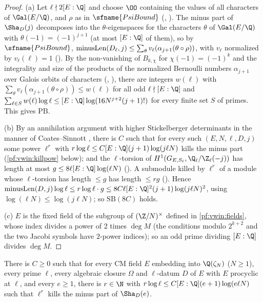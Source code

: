 \begin{proof}
(a) Let $\ell\nmid2[E:\Q]$ and choose $\OO$ containing the values of all characters of $\Gal(E/\Q)$, and $\rho$ as in $\sfname{PsiBound}$
(, ). The minus part of $\Sha_D(j)$ decomposes into the
$\theta$-eigenspaces for the characters $\theta$ of $\Gal(E/\Q)$ with $\theta(-1)=(-1)^{j+1}$ (at most $[E:\Q]$ of them), so by
$\sfname{PsiBound}$, $\mathrm{minusLen}(D_\ell,j)\le\sum_\theta v_\ell(\alpha_{j+1}(\theta\circ\rho))$, with $v_\ell$ normalized by $v_\ell(\ell)=1$
(). By the non-vanishing of $B_{k,\chi}$ for $\chi(-1)=(-1)^k$ and the integrality and size of the products of
the normalized Bernoulli numbers $\alpha_{j+1}$ over Galois orbits of characters (,
), there are integers $w(\ell)$ with $\sum_\theta v_\ell(\alpha_{j+1}(\theta\circ\rho))\le w(\ell)$ for all
odd $\ell\nmid[E:\Q]$ and $\sum_{\ell\in S}w(\ell)\log\ell\le[E:\Q]\log(16N^{j+2}(j+1)!)$ for every finite set $S$ of primes. This gives
$\mathrm{PB}$.

(b) By an annihilation argument with higher Stickelberger determinants in the manner of Coates--Sinnott \cite{CoatesSinnott1974}, there is $C$
such that for every such $(E,N,\ell,D,j)$ some power $\ell^r$ with $r\log\ell\le C[E:\Q](j+1)\log(j\ell N)$ kills the minus part
(\cref{pf:vwin:killpow} below); and the $\ell$-torsion of $H^1(G_{E,S_\ell},\vwinQZ(-j))$ has length at most
$g\le8\ell[E:\Q]\log(\ell N)$ (). A submodule killed by $\ell^r$ of a module whose $\ell$-torsion has length $\le g$
has length $\le rg$ (). Hence $\vwinmin(D,j)\log\ell\le r\log\ell\cdot g\le8C\ell[E:\Q]^2(j+1)\log(j\ell N)^2$,
using $\log(\ell N)\le\log(j\ell N)$; so $\mathrm{SB}(8C)$ holds.

(c) $E$ is the fixed field of the subgroup of $(\Z/N)^\times$ defined in \cref{pf:vwin:fields}, whose index divides a power of $2$ times
$\deg M$ (the conditions modulo $2^{k+2}$ and the two Jacobi symbols have $2$-power indices); so an odd prime dividing $[E:\Q]$ divides
$\deg M$.
\end{proof}

\begin{lemma}\label{pf:vwin:killpow}
There is $C\ge0$ such that for every CM field $E$ embedding into $\Q(\zeta_N)$ ($N\ge1$), every prime $\ell$, every algebraic closure $\Omega$
and $\ell$-datum $D$ of $E$ with $E$ procyclic at $\ell$, and every $e\ge1$, there is $r\in\N$ with $r\log\ell\le C[E:\Q](e+1)\log(e\ell N)$ such
that $\ell^r$ kills the minus part of $\Sha_D(e)$.
\end{lemma}

